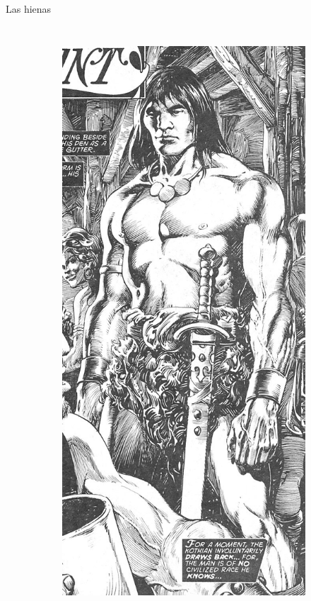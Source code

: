 \begin{frame}{Las hienas}
\begin{columns}
\begin{figure}[htp]
\begin{subfigure}[b]{0.23\textwidth}
				\includegraphics[width=\textwidth]{img/conan/TSSC}
			\end{subfigure}
		\end{figure}
	\end{columns}
\end{frame}
\note[itemize]{
	\item
}

